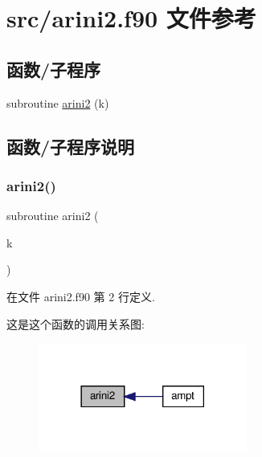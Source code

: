 \hypertarget{arini2_8f90}{}\section{src/arini2.f90 文件参考}
\label{arini2_8f90}
\subsection*{函数/子程序}
\begin{DoxyCompactItemize}
\item 
subroutine \mbox{\hyperlink{arini2_8f90_a88c366efe366ee10ee25ca194cb18738}{arini2}} (k)
\end{DoxyCompactItemize}


\subsection{函数/子程序说明}
\mbox{\label{arini2_8f90_a88c366efe366ee10ee25ca194cb18738}} 
\subsubsection{\texorpdfstring{arini2()}{arini2()}}
{\footnotesize\ttfamily subroutine arini2 (\begin{DoxyParamCaption}\item[{}]{k }\end{DoxyParamCaption})}



在文件 arini2.\+f90 第 2 行定义.

这是这个函数的调用关系图\+:
\nopagebreak
\begin{figure}[H]
\begin{center}
\leavevmode
\includegraphics[width=194pt]{arini2_8f90_a88c366efe366ee10ee25ca194cb18738_icgraph}
\end{center}
\end{figure}
